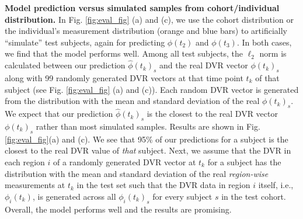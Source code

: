 \documentclass{article}
\begin{document}
\textbf{Model prediction versus simulated samples from cohort/individual distribution.}
In  Fig. \ref{fig:eval_fig} (a) and (c), we use the cohort distribution or the individual's measurement distribution (orange and blue bars) to artificially ``simulate''
test subjects, again for predicting $\phi(t_2)$ and $\phi(t_3)$. In both cases, we find that the model performs well. 
Among all test subjects, the $\ell_2$ norm is calculated between our prediction $\hat{\phi}(t_k)_s$
and the real DVR vector $\phi(t_k)_s$ along with 99 randomly generated DVR vectors
at that time point $t_k$ of that subject (see Fig. \ref{fig:eval_fig} (a) and (c)). 
Each random DVR vector is generated from the distribution with the mean and standard deviation of the real $\phi(t_k)_s$.
We expect that our prediction $\hat{\phi}(t_k)_s$ is the closest to the real DVR vector $\phi(t_k)_s$ rather than most simulated samples.
Results are shown in Fig. \ref{fig:eval_fig}(a) and (c). We see that 95\% of our predictions for a subject is the closest to the real DVR value
of {\em that} subject.
Next, we assume that the DVR in each region $i$ of a randomly generated DVR vector at $t_k$ for a subject has the distribution
with the mean and standard deviation of the real {\em region-wise} measurements at $t_k$ in the test set such that the DVR data in region $i$ itself,
i.e., $\phi_i(t_k)$, is generated across all $\phi_i(t_k)_s$ for every subject $s$ in the test cohort.
Overall, the model performs well and the results are promising.




\end{document}
